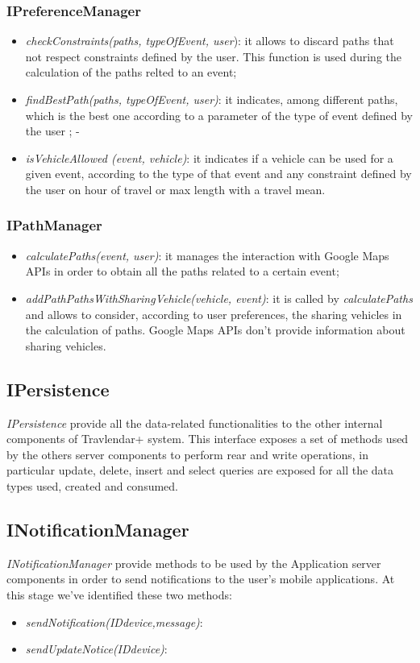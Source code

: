 \subsubsection{IPreferenceManager}
\begin{itemize}
\item \textit{checkConstraints(paths, typeOfEvent, user}): it allows to discard paths that not respect constraints defined by the user. This function is used during the calculation of the paths relted to an event;
\item \textit{findBestPath(paths, typeOfEvent, user)}: it indicates, among different paths, which is the best one according to a parameter of the type of event defined by the user ;
-\item \textit{isVehicleAllowed (event, vehicle)}: it indicates if a vehicle can be used for a given event, according to the type of that event and any constraint defined by the user on hour of travel or max length with a travel mean.
\end{itemize}
\subsubsection{IPathManager}
\begin{itemize}
\item \textit{calculatePaths(event, user)}: it manages the interaction with Google Maps APIs in order to obtain all the paths related to a certain event;
\item \textit{addPathPathsWithSharingVehicle(vehicle, event)}: it is called by \textit{calculatePaths} and allows to consider, according to user preferences, the sharing vehicles in the calculation of paths. Google Maps APIs don't provide information about sharing vehicles. 
\end{itemize}

\subsection{IPersistence}
\label{subsect:IPersistence}
\textit{IPersistence} provide all the data-related functionalities to the other internal components of Travlendar+ system. This interface exposes a set of methods used by the others server components to perform rear and write operations, in particular update, delete, insert and select queries are exposed for all the data types used, created and consumed.

\subsection{INotificationManager}
\label{subsect:INotificationManager}
\textit{INotificationManager} provide methods to be used by the Application server components in order to send notifications to the user's mobile applications. At this stage we've identified these two methods:
\begin{itemize}
	\item \textit{sendNotification(IDdevice,message)}:
	\item \textit{sendUpdateNotice(IDdevice)}:
\end{itemize}


